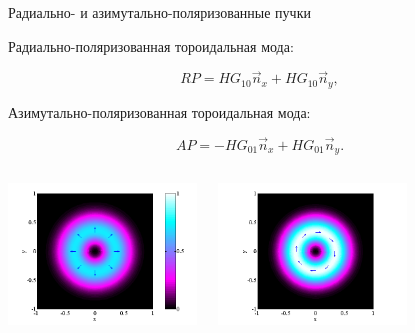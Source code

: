 \documentclass[9pt, compress, xcolor=table]{beamer}
\begin{document}
\begin{frame}{Радиально- и азимутально-поляризованные пучки}

Радиально-поляризованная тороидальная мода:

\begin{equation*}
RP = HG_{10} \vec n_x + HG_{10}\vec n_y,
\end{equation*}

Азимутально-поляризованная тороидальная мода:

\begin{equation*}
AP = - HG_{01} \vec n_x + HG_{01} \vec n_y.
\end{equation*}

\begin{columns}[c]
\column{6cm}

\begin{center}
\includegraphics[width=5cm]{fig3_13}
\end{center}

\column{6cm}
\begin{center}
\includegraphics[width=5cm]{fig3_17}
\end{center}
\end{columns}


\end{frame}
\end{document}
